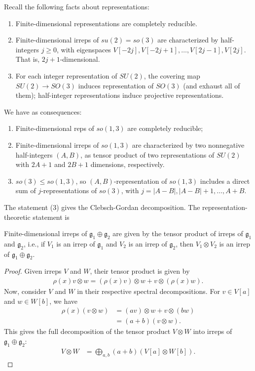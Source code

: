 Recall the following facts about representations:
\begin{enumerate}
    \item Finite-dimensional representations are completely reducible.
    \item Finite-dimensional irreps of $su(2) = so(3)$ are characterized by half-integers $j \geq 0$, with eigenspaces $V[-2j], V[-2j+1], \ldots, V[2j-1], V[2j]$. That is, $2j+1$-dimensional.
    \item For each integer representation of $SU(2)$, the covering map $SU(2) \to SO(3)$ induces representation of $SO(3)$ (and exhaust all of them); half-integer representations induce projective representations.
\end{enumerate}
We have as consequences:
\begin{enumerate}
    \item Finite-dimensional reps of $so(1,3)$ are completely reducible;
    \item Finite-dimensional irreps of $so(1,3)$ are characterized by two nonnegative half-integers $(A,B)$, as tensor product of two representations of $SU(2)$ with $2A+1$ and $2B+1$ dimensions, respectively.
    \item $so(3) \leq so(1,3)$, so $(A,B)$-representation of $so(1,3)$ includes a direct sum of $j$-representations of $so(3)$, with $j = |A - B|, |A - B| + 1, \ldots, A + B$.
\end{enumerate}
The statement (3) gives the Clebsch-Gordan decomposition. The representation-theoretic statement is
\begin{theorem}
    Finite-dimensional irreps of $\mathfrak{g_1} \oplus \mathfrak{g_2}$ are given by the tensor product of irreps of $\mathfrak{g_1}$ and $\mathfrak{g_2}$, i.e., if $V_1$ is an irrep of $\mathfrak{g_1}$ and $V_2$ is an irrep of $\mathfrak{g_2}$, then $V_1 \otimes V_2$ is an irrep of $\mathfrak{g_1} \oplus \mathfrak{g_2}$.
\end{theorem}
\begin{proof}
    Given irreps $V$ and $W$, their tensor product is given by
    \begin{align*}
        \rho(x) v \otimes w = (\rho(x) v) \otimes w + v \otimes (\rho(x) w).
    \end{align*}
    Now, consider $V$ and $W$ in their respective spectral decompositions. For $v \in V[a]$ and $w \in W[b]$, we have
    \begin{align*}
        \rho(x) (v \otimes w) &= (a v) \otimes w + v \otimes (b w) \\
        &= (a + b) (v \otimes w).
    \end{align*}
    This gives the full decomposition of the tensor product $V \otimes W$ into irreps of $\mathfrak{g_1} \oplus \mathfrak{g_2}$:
    \begin{align*}
        V \otimes W &= \bigoplus_{a, b} (a + b) (V[a] \otimes W[b]).
    \end{align*}
\end{proof}


